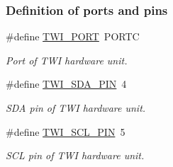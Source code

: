 \subsubsection*{Definition of ports and pins}
\begin{DoxyCompactItemize}
\item 
\#define \hyperlink{a00014_ga762c164f4acd04d3ce3627fe73e7c018}{T\+W\+I\+\_\+\+P\+O\+RT}~P\+O\+R\+TC\hypertarget{a00014_ga762c164f4acd04d3ce3627fe73e7c018}{}\label{a00014_ga762c164f4acd04d3ce3627fe73e7c018}

\begin{DoxyCompactList}\small\item\em Port of T\+WI hardware unit. \end{DoxyCompactList}\item 
\#define \hyperlink{a00014_ga3f14ed8491293d0dda1372cceaa39851}{T\+W\+I\+\_\+\+S\+D\+A\+\_\+\+P\+IN}~4\hypertarget{a00014_ga3f14ed8491293d0dda1372cceaa39851}{}\label{a00014_ga3f14ed8491293d0dda1372cceaa39851}

\begin{DoxyCompactList}\small\item\em S\+DA pin of T\+WI hardware unit. \end{DoxyCompactList}\item 
\#define \hyperlink{a00014_gac0ad8b33f1be48e211f1eeae2dd65cee}{T\+W\+I\+\_\+\+S\+C\+L\+\_\+\+P\+IN}~5\hypertarget{a00014_gac0ad8b33f1be48e211f1eeae2dd65cee}{}\label{a00014_gac0ad8b33f1be48e211f1eeae2dd65cee}

\begin{DoxyCompactList}\small\item\em S\+CL pin of T\+WI hardware unit. \end{DoxyCompactList}\end{DoxyCompactItemize}
